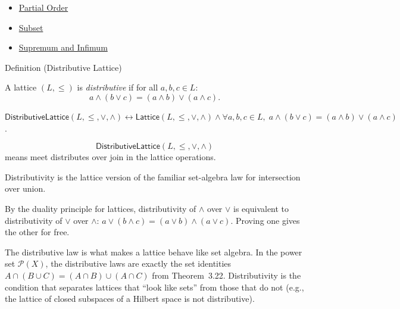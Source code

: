 \begin{dependencies}
\begin{itemize}
  \item \hyperref[def:partial-order]{Partial Order}
  \item \hyperref[def:subset]{Subset}
  \item \hyperref[def:sup-inf]{Supremum and Infimum}
\end{itemize}
\end{dependencies}


\begin{definitionbox}{Definition (Distributive Lattice)}
\begin{definition}\label{def:distributive-lattice}
A lattice $(L, \leq)$ is \emph{distributive} if for all $a, b, c \in L$:
\[
  a \wedge (b \vee c) = (a \wedge b) \vee (a \wedge c).
\]
\end{definition}
\end{definitionbox}

\begin{remark*}
$\mathsf{DistributiveLattice}(L,\leq,\vee,\wedge)\leftrightarrow
\mathsf{Lattice}(L,\leq,\vee,\wedge)\wedge
\forall a,b,c\in L,\; a\wedge(b\vee c)=(a\wedge b)\vee(a\wedge c)$.
\end{remark*}

\begin{remark*}
\[
  \mathsf{DistributiveLattice}(L,\leq,\vee,\wedge)
\] means meet distributes over
join in the lattice operations.
\end{remark*}

\begin{remark*}[Interpretation]
Distributivity is the lattice version of the familiar set-algebra law for
intersection over union.
\end{remark*}

\begin{remark*}[Exposition]
By the duality principle for lattices, distributivity of $\wedge$ over $\vee$
is equivalent to distributivity of $\vee$ over $\wedge$:
$a \vee (b \wedge c) = (a \vee b) \wedge (a \vee c)$.
Proving one gives the other for free.
\end{remark*}

\begin{remark*}[Exposition]
The distributive law is what makes a lattice behave like set algebra.  In the
power set $\mathcal{P}(X)$, the distributive laws are exactly the set
identities $A \cap (B \cup C) = (A \cap B) \cup (A \cap C)$ from
Theorem~3.22.  Distributivity is the condition that separates lattices that
``look like sets'' from those that do not (e.g., the lattice of closed
subspaces of a Hilbert space is not distributive).
\end{remark*}

